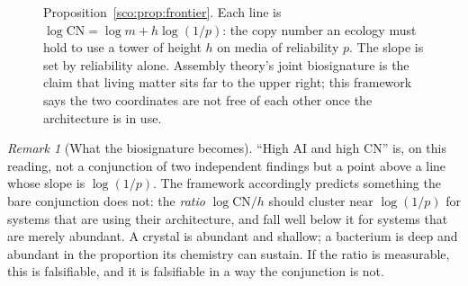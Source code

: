 \documentclass[11pt]{article}
\theoremstyle{plain}
\theoremstyle{definition}
\theoremstyle{remark}
\newtheorem{remark}[theorem]{Remark}
\newcommand{\AI}{\mathrm{AI}}
\newcommand{\CN}{\mathrm{CN}}
\begin{document}
\begin{figure}[t]
\centering
{}
\caption{Proposition~\ref{sco:prop:frontier}. Each line is
$\log \CN = \log m + h \log(1/p)$: the copy number an ecology must hold to
use a tower of height $h$ on media of reliability $p$. The slope is
set by reliability alone. Assembly theory's joint biosignature is the claim
that living matter sits far to the upper right; this framework says the
two coordinates are not free of each other once the architecture is in
use.}
\label{sco:fig:frontier}
\end{figure}

\begin{remark}[What the biosignature becomes]\label{sco:rem:biosig}
``High $\AI$ and high $\CN$'' is, on this reading, not a conjunction of two
independent findings but a point above a line whose slope is
$\log(1/p)$. The framework accordingly predicts something the bare
conjunction does not: the \emph{ratio} $\log \CN / h$ should cluster near
$\log(1/p)$ for systems that are using their architecture, and fall well
below it for systems that are merely abundant. A crystal is abundant and
shallow; a bacterium is deep and abundant in the proportion its chemistry
can sustain. If the ratio is measurable, this is falsifiable, and it is
falsifiable in a way the conjunction is not.
\end{remark}
\end{document}
